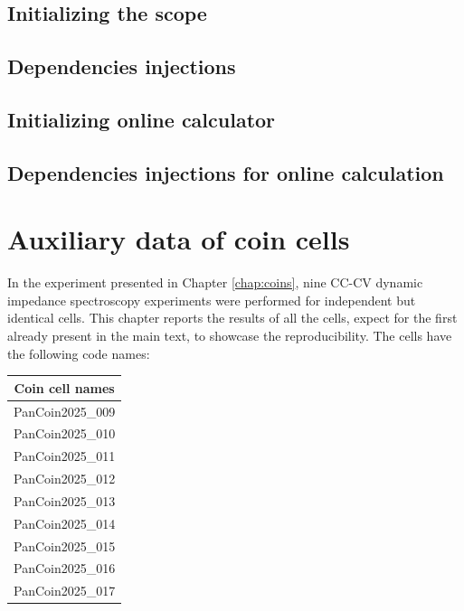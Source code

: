 \section{Initializing the scope}


\section{Dependencies injections}


\section{Initializing online calculator}


\section{Dependencies injections for online calculation}


\chapter{Auxiliary data of coin cells}

In the experiment presented in Chapter \ref{chap:coins}, nine CC-CV dynamic impedance spectroscopy experiments were performed for independent but identical cells.
This chapter reports the results of all the cells, expect for the first already present in the main text, to showcase the reproducibility. 
The cells have the following code names:
\begin{table}[h]
  \centering
  \begin{tabular}{c}
    \toprule
    \textbf{Coin cell names} \\
    \midrule
    PanCoin2025\_009 \\
    PanCoin2025\_010 \\
    PanCoin2025\_011 \\
    PanCoin2025\_012 \\
    PanCoin2025\_013 \\
    PanCoin2025\_014 \\
    PanCoin2025\_015 \\
    PanCoin2025\_016 \\
    PanCoin2025\_017\\
    \bottomrule
  \end{tabular}
\end{table}

